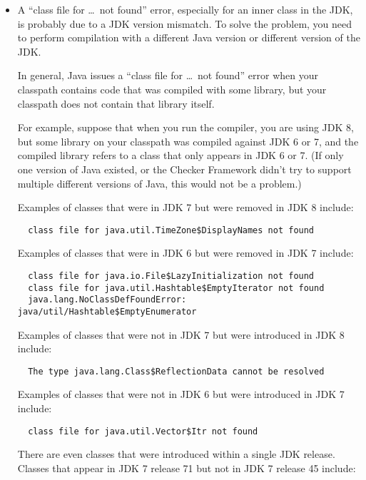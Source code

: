 \begin{itemize}
\item
A ``class file for \ldots\ not found'' error, especially for an inner class
in the JDK, is probably due to a JDK version mismatch.  To solve the
problem, you need to perform compilation with a different Java version or
different version of the JDK\@.

In general, Java issues a ``class file for \ldots\ not found'' error when
your classpath contains code that was compiled
with some library, but your classpath does not contain that library itself.

For example, suppose that when you run the compiler, you are using JDK 8,
but some library on your classpath was compiled against JDK 6 or 7, and the
compiled library refers to a class that only appears in JDK 6 or 7.  (If only
one version of Java existed, or the Checker Framework didn't try to support
multiple different versions of Java, this would not be a problem.)

Examples of classes that were in JDK 7 but were removed in JDK 8 include:

\begin{Verbatim}
  class file for java.util.TimeZone$DisplayNames not found
\end{Verbatim}

Examples of classes that were in JDK 6 but were removed in JDK 7 include:

\begin{Verbatim}
  class file for java.io.File$LazyInitialization not found
  class file for java.util.Hashtable$EmptyIterator not found
  java.lang.NoClassDefFoundError: java/util/Hashtable$EmptyEnumerator
\end{Verbatim}

Examples of classes that were not in JDK 7 but were introduced in JDK 8 include:

\begin{Verbatim}
  The type java.lang.Class$ReflectionData cannot be resolved
\end{Verbatim}

Examples of classes that were not in JDK 6 but were introduced in JDK 7 include:

\begin{Verbatim}
  class file for java.util.Vector$Itr not found
\end{Verbatim}

There are even classes that were introduced within a single JDK release.
Classes that appear in JDK 7 release 71 but not in JDK 7 release 45 include:


\end{itemize}

